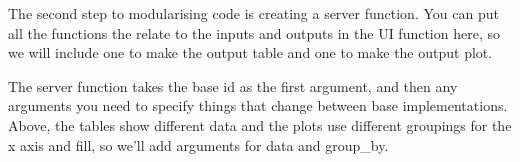 \documentclass[
  oneside]{book}
\newenvironment{Shaded}{\begin{snugshade}}{\end{snugshade}}
\newcommand{\AttributeTok}[1]{\textcolor[rgb]{0.77,0.63,0.00}{#1}}
\newcommand{\CommentTok}[1]{\textcolor[rgb]{0.56,0.35,0.01}{\textit{#1}}}
\newcommand{\ConstantTok}[1]{\textcolor[rgb]{0.00,0.00,0.00}{#1}}
\newcommand{\FloatTok}[1]{\textcolor[rgb]{0.00,0.00,0.81}{#1}}
\newcommand{\FunctionTok}[1]{\textcolor[rgb]{0.00,0.00,0.00}{#1}}
\newcommand{\NormalTok}[1]{#1}
\newcommand{\OtherTok}[1]{\textcolor[rgb]{0.56,0.35,0.01}{#1}}
\newcommand{\SpecialCharTok}[1]{\textcolor[rgb]{0.00,0.00,0.00}{#1}}
\begin{document}
\begin{Shaded}
\end{Shaded}

The second step to modularising code is creating a server function. You can put all the functions the relate to the inputs and outputs in the UI function here, so we will include one to make the output table and one to make the output plot.

The server function takes the base id as the first argument, and then any arguments you need to specify things that change between base implementations. Above, the tables show different data and the plots use different groupings for the x axis and fill, so we'll add arguments for \AttributeTok{data} and \AttributeTok{group\_by}.
\end{document}
